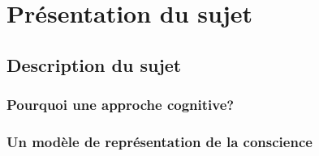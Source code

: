 \part{Présentation du sujet}

\clearemptydoublepage
\chapter{Description du sujet} 
\minitoc


\section{Pourquoi une approche cognitive?} 


\section{Un modèle de représentation de la conscience}
\label{un_modele_de_representation_de_la_conscience}
